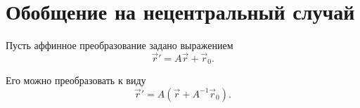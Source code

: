 \section{Обобщение на нецентральный случай}

Пусть аффинное преобразование задано выражением
$$\vec r' = A \vec r + \vec r_0.$$

Его можно преобразовать к виду
$$\vec r' = A \left(\vec r + A^{-1} \vec r_0\right).$$